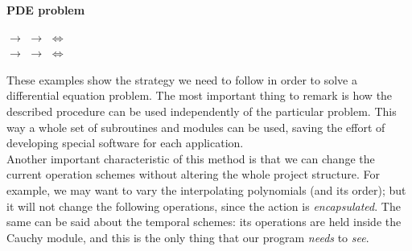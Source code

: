 \begin{framed}
\textbf{\large PDE problem}\\
\small{

	$\rightarrow$
	$\rightarrow$
	$\iff$
	\\
	
	$\rightarrow$
	$\rightarrow$
	$\iff$
	 \\

}
\end{framed}


\hspace{5cm}

These examples show the strategy we need to follow in order to solve a
differential equation problem. The most important thing to remark is how the
described procedure can be used independently of the particular problem. This
way a whole set of subroutines and modules can be used, saving the effort of
developing special software for each application. \\

Another important characteristic of this method is that we can change the
current operation schemes without altering the whole project structure. For
example, we may want to vary the interpolating polynomials (and its order); but
it will not change the following operations, since the action is
\textit{encapsulated}. The same can be said about the temporal schemes: its
operations are held inside the Cauchy module, and this is the only thing that
our program \textit{needs} to \textit{see}.\\

